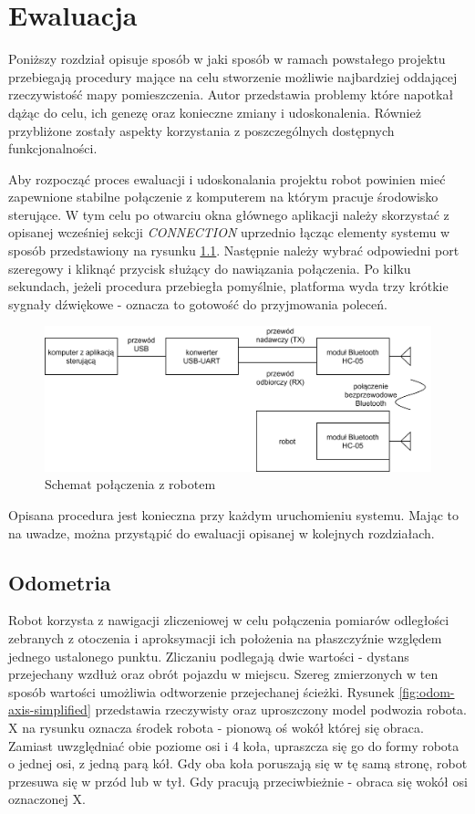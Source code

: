 \chapter{Ewaluacja}
\label{sec:evaluation}

Poniższy rozdział opisuje sposób w jaki sposób w ramach powstałego projektu przebiegają procedury mające na celu stworzenie możliwie najbardziej oddającej rzeczywistość mapy pomieszczenia. Autor przedstawia problemy które napotkał dążąc do celu, ich genezę oraz konieczne zmiany i udoskonalenia. Również przybliżone zostały aspekty korzystania z poszczególnych dostępnych funkcjonalności.

Aby rozpocząć proces ewaluacji i udoskonalania projektu robot powinien mieć zapewnione stabilne połączenie z komputerem na którym pracuje środowisko sterujące. W tym celu po otwarciu okna głównego aplikacji należy skorzystać z opisanej wcześniej sekcji \emph{CONNECTION} uprzednio łącząc elementy systemu w sposób przedstawiony na rysunku \ref{fig:pc-bt-connection}. Następnie należy wybrać odpowiedni port szeregowy i kliknąć przycisk służący do nawiązania połączenia. Po kilku sekundach, jeżeli procedura przebiegła pomyślnie, platforma wyda trzy krótkie sygnały dźwiękowe - oznacza to gotowość do przyjmowania poleceń.

\begin{figure}[ht]
	\centering
		\includegraphics[width=1\linewidth]{rys/pc-bluetooth-robot connection.png}
	\caption{Schemat połączenia z robotem}
	\label{fig:pc-bt-connection}
\end{figure}

Opisana procedura jest konieczna przy każdym uruchomieniu systemu. Mając to na uwadze, można przystąpić do ewaluacji opisanej w kolejnych rozdziałach.

\section{Odometria}
\label{sec:odometry}
Robot korzysta z nawigacji zliczeniowej w celu połączenia pomiarów odległości zebranych z otoczenia i aproksymacji ich położenia na płaszczyźnie względem jednego ustalonego punktu. Zliczaniu podlegają dwie wartości - dystans przejechany wzdłuż oraz obrót pojazdu w miejscu. Szereg zmierzonych w ten sposób wartości umożliwia odtworzenie przejechanej ścieżki. Rysunek \ref{fig:odom-axis-simplified} przedstawia rzeczywisty oraz uproszczony model podwozia robota. X na rysunku oznacza środek robota - pionową oś wokół której się obraca. Zamiast uwzględniać obie poziome osi i 4 koła, upraszcza się go do formy robota o jednej osi, z jedną parą kół. Gdy oba koła poruszają się w tę samą stronę, robot przesuwa się w przód lub w tył. Gdy pracują przeciwbieżnie - obraca się wokół osi oznaczonej X.  

